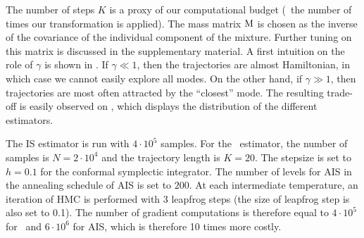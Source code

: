 \documentclass{article}
\begin{document}
The number of steps $K$ is  a proxy of our computational budget (\ie~the number of times our transformation is applied). The mass matrix $\mathrm{M}$ is chosen as the inverse of the covariance of the individual component of the mixture. Further tuning on this matrix is discussed in the supplementary material.
A first intuition on the role of $\gamma$ is shown in . If $\gamma \ll 1$, then the trajectories are almost Hamiltonian, in which case we cannot easily explore all modes. On the other hand, if $\gamma \gg 1 $,  then trajectories are most often attracted by the ``closest'' mode. The resulting trade-off is easily observed on , which displays the distribution of the different estimators.


The IS estimator is run with $4 \cdot 10^5$ samples.
For the \IFIS\ estimator, the number of samples is $N = 2 \cdot 10^4$ and the trajectory length is $K=20$. The stepsize is set to $h= 0.1$ for the conformal symplectic integrator.
The number of levels for AIS in the annealing schedule of AIS is set to $200$. At each intermediate temperature, an iteration of HMC is performed with 3 leapfrog steps (the size of leapfrog step is also set to 0.1).
The number of gradient computations is therefore equal to $4 \cdot 10^5$ for \IFIS\ and $6 \cdot 10^6$ for AIS, which is therefore 10 times more costly.
\end{document}
